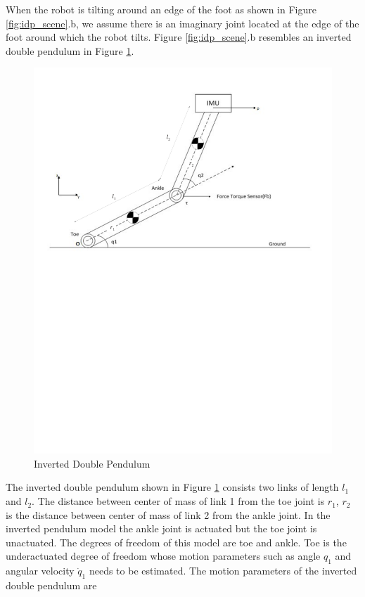 When the robot is tilting around an edge of the foot as shown in Figure \ref{fig:idp_scene}.b, we assume there is an imaginary joint located at the edge of the foot around which the robot tilts. Figure \ref{fig:idp_scene}.b resembles an inverted double pendulum in Figure \ref{fig:idp}.
\begin{figure}[H]
	\centering
	\includegraphics[trim= 0mm 145mm 0mm 0mm,clip, scale=0.65]{Bilder/inv_db_pend.pdf}
	\caption[Inverted Double Pendulum]{Inverted Double Pendulum}
	\label{fig:idp}
\end{figure}
 The inverted double pendulum shown in Figure \ref{fig:idp} consists two links of length $l_1$ and $l_2$. The distance between center of mass of link 1 from the toe joint is $r_1$, $r_2$ is the distance between center of mass of link 2 from the ankle joint. In the inverted pendulum model the ankle joint is actuated but the toe joint is unactuated. The degrees of freedom of this model are toe and ankle. Toe is the underactuated degree of freedom whose motion parameters such as angle $q_1$ and angular velocity $\dot{q}_1$ needs to be estimated. The motion parameters of the inverted double pendulum are 
